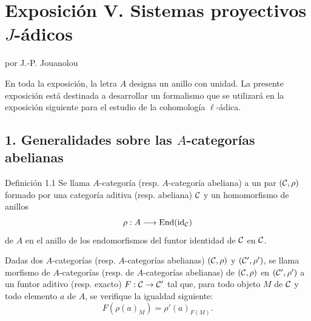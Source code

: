 \section*{Exposición V. Sistemas proyectivos $J$-ádicos}
\begin{center}por J.-P. Jouanolou\end{center}

En toda la exposición, la letra $A$ designa un anillo con unidad. La presente exposición está destinada a desarrollar un formalismo que se utilizará en la exposición siguiente para el estudio de la cohomología $\ell$-ádica.

\subsection*{1. Generalidades sobre las $A$-categorías abelianas}

\begin{statement}{Definición 1.1}
Se llama $A$-categoría (resp. $A$-categoría abeliana) a un par $(\mathcal C,\rho)$ formado por una categoría aditiva (resp. abeliana) $\mathcal C$ y un homomorfismo de anillos
\[
\rho:A\longrightarrow \operatorname{End}(\operatorname{id}_{\mathcal C})
\]
de $A$ en el anillo de los endomorfismos del funtor identidad de $\mathcal C$ en $\mathcal C$.
\end{statement}

Dadas dos $A$-categorías (resp. $A$-categorías abelianas) $(\mathcal C,\rho)$ y $(\mathcal C',\rho')$, se llama morfismo de $A$-categorías (resp. de $A$-categorías abelianas) de $(\mathcal C,\rho)$ en $(\mathcal C',\rho')$ a un funtor aditivo (resp. exacto) $F:\mathcal C\to\mathcal C'$ tal que, para todo objeto $M$ de $\mathcal C$ y todo elemento $a$ de $A$, se verifique la igualdad siguiente:
\[
F(\rho(a)_M)=\rho'(a)_{F(M)}.
\]

